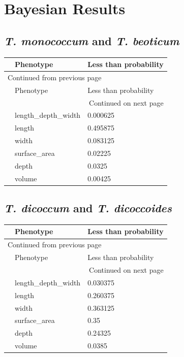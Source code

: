 \documentclass[11pt]{report}
\begin{document}
\chapter{Bayesian Results}
\label{sec:org897d774}

\section{\emph{T. monococcum} and \emph{T. beoticum}}
\label{sec:orgd52930f}
\begin{longtable}{l|l|l}
 & Phenotype & Less than probability\\
\hline
\endfirsthead
\multicolumn{3}{l}{Continued from previous page} \\
\hline

 & Phenotype & Less than probability \\

\hline
\endhead
\hline\multicolumn{3}{r}{Continued on next page} \\
\endfoot
\endlastfoot
\hline
 & length\_depth\_width & 0.000625\\
 & length & 0.495875\\
 & width & 0.083125\\
 & surface\_area & 0.02225\\
 & depth & 0.0325\\
 & volume & 0.00425\\
\end{longtable}

\section{\emph{T. dicoccum} and \emph{T. dicoccoides}}
\label{sec:org7b5b14a}
\begin{longtable}{l|l|l}
 & Phenotype & Less than probability\\
\hline
\endfirsthead
\multicolumn{3}{l}{Continued from previous page} \\
\hline

 & Phenotype & Less than probability \\

\hline
\endhead
\hline\multicolumn{3}{r}{Continued on next page} \\
\endfoot
\endlastfoot
\hline
 & length\_depth\_width & 0.030375\\
 & length & 0.260375\\
 & width & 0.363125\\
 & surface\_area & 0.35\\
 & depth & 0.24325\\
 & volume & 0.0385\\
\end{longtable}
\end{document}
